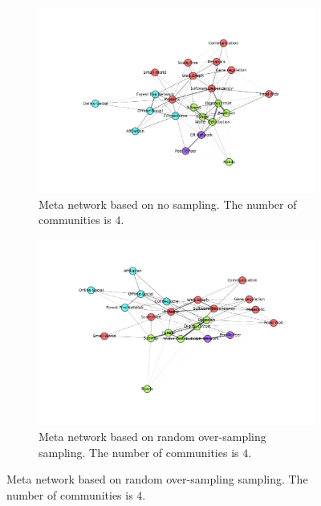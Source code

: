 \documentclass{article}
\begin{document}
\begin{figure}[H]
	\begin{subfigure}{0.48\textwidth}
	\includegraphics[width=\linewidth]{figs/similarity/SubDomain/None/g_community.png}
	\caption{Meta network based on no sampling. The number of communities is $4$.} \label{no_graph_sub_community}
	\end{subfigure}\hspace*{\fill}
	\begin{subfigure}{0.48\textwidth}
	\includegraphics[width=\linewidth]{figs/similarity/SubDomain/RandomOver/g_community.png}
	\caption{Meta network based on random over-sampling sampling.  The number of communities is $4$.} \label{random_over_graph_sub_community}
	\end{subfigure}
	

\end{figure}
\end{document}
